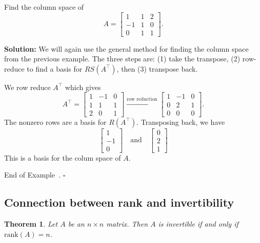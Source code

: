 \documentclass[10pt]{article}
\newtheorem{theorem}{Theorem}
\theoremstyle{definition}
\newtheorem{example}[theorem]{Example}
\renewenvironment{example}
{\begin{oldexample}}
  {\par\smallskip\hfill   End of Example~\theexample. $\square$    \par\end{oldexample}}
\newcommand{\Fl}[1]{\vspace{5mm}\noindent\textbf{#1}}%
\begin{document}
\begin{example}
  Find the column space of
  \begin{equation*}
    A =
    \begin{bmatrix}
      1&1&2\\
      -1&1&0\\
      0&1&1
    \end{bmatrix}.
  \end{equation*}

  \Fl{Solution:} We will again use the general method for finding the column
  space from the previous example. The three steps are: (1) take the transpose,
  (2) row-reduce to find a basis for $RS(A^{\top})$, then (3) transpose back.

  We row reduce $A^{\top}$ which gives
  \begin{equation*}
    A^{\top} =
    \begin{bmatrix}
      1&-1&0\\
      1&1&1\\
      2&0&1
    \end{bmatrix}
    \overset{\text{row reduction}}{\longrightarrow}
    \begin{bmatrix}
      1&-1&0\\
      0&2&1\\
      0&0&0
    \end{bmatrix}.
  \end{equation*}
  The nonzero rows are a basis for $R(A^{\top})$. Transposing back, we have
  \begin{equation*}
    \begin{bmatrix}
      1\\-1\\0
    \end{bmatrix}
    \quad \text{and} \quad
    \begin{bmatrix}
      0\\2\\1
    \end{bmatrix}
  \end{equation*}
  This is a basis for the colum space of $A$. 
\end{example}


\subsection{Connection between rank and invertibility}

\begin{theorem}
  \label{thm:rank-invertibiility}
  Let $A$ be an $n\times n$ matrix. Then $A$ is invertible if and only if
  $\text{rank}(A)=n$.
\end{theorem}
\end{document}
